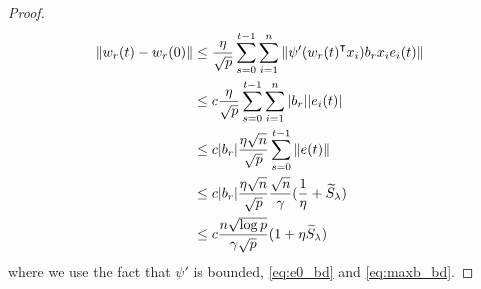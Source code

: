 \begin{proof}
\begin{equation*}
\begin{aligned}
    \|w_r(t)-w_r(0)\| &\leq \frac{\eta}{\sqrt p}\sum_{s=0}^{t-1}\sum_{i=1}^n \|\psi'(w_r(t)\transpose x_i)b_rx_i e_i(t)\| \\
    & \leq c\frac{\eta}{\sqrt p}\sum_{s=0}^{t-1}\sum_{i=1}^n |b_r| |e_i(t)| \\
    & \leq c|b_r|\frac{\eta\sqrt n}{\sqrt p}\sum_{s=0}^{t-1} \|e(t)\| \\
    & \leq c|b_r|\frac{\eta\sqrt n}{\sqrt p}\frac{\sqrt n}{\gamma}(\frac{1}{\eta}+\tilde{S}_\lambda) \\
    & \leq c\frac{n\sqrt{\log p}}{\gamma\sqrt p} (1+\eta \tilde{S}_\lambda)
\end{aligned}
\end{equation*}
where we use the fact that $\psi'$ is bounded, \eqref{eq:e0_bd} and \eqref{eq:maxb_bd}.
\end{proof}



